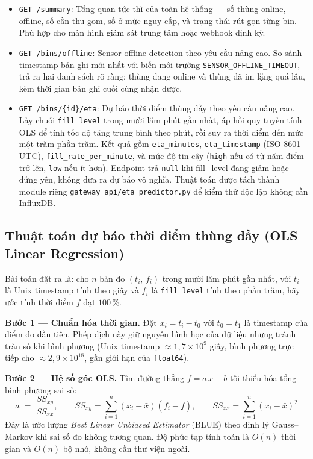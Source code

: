 \documentclass[12pt,a4paper]{article}
\begin{document}
\begin{itemize}[nosep]
\item \texttt{GET /summary}: Tổng quan tức thì của toàn hệ thống --- số thùng online, offline, số cần thu gom, số ở mức nguy cấp, và trạng thái rút gọn từng bin. Phù hợp cho màn hình giám sát trung tâm hoặc webhook định kỳ.

\item \texttt{GET /bins/offline}: Sensor offline detection theo yêu cầu nâng cao. So sánh timestamp bản ghi mới nhất với biến môi trường \texttt{SENSOR\_OFFLINE\_TIMEOUT}, trả ra hai danh sách rõ ràng: thùng đang online và thùng đã im lặng quá lâu, kèm thời gian bản ghi cuối cùng nhận được.

\item \texttt{GET /bins/\{id\}/eta}: Dự báo thời điểm thùng đầy theo yêu cầu nâng cao. Lấy chuỗi \texttt{fill\_level} trong mười lăm phút gần nhất, áp hồi quy tuyến tính OLS để tính tốc độ tăng trung bình theo phút, rồi suy ra thời điểm đến mức một trăm phần trăm. Kết quả gồm \texttt{eta\_minutes}, \texttt{eta\_timestamp} (ISO 8601 UTC), \texttt{fill\_rate\_per\_minute}, và mức độ tin cậy (\texttt{high} nếu có từ năm điểm trở lên, \texttt{low} nếu ít hơn). Endpoint trả \texttt{null} khi fill\_level đang giảm hoặc đứng yên, không đưa ra dự báo vô nghĩa. Thuật toán được tách thành module riêng \texttt{gateway\_api/eta\_predictor.py} để kiểm thử độc lập không cần InfluxDB.
\end{itemize}

\subsection{Thuật toán dự báo thời điểm thùng đầy (OLS Linear Regression)}

Bài toán đặt ra là: cho $n$ bản đo $(t_i,\,f_i)$ trong mười lăm phút gần nhất, với $t_i$ là Unix timestamp tính theo giây và $f_i$ là \texttt{fill\_level} tính theo phần trăm, hãy ước tính thời điểm $f$ đạt $100\,\%$.

\textbf{Bước 1 — Chuẩn hóa thời gian.} Đặt $x_i = t_i - t_0$ với $t_0 = t_1$ là timestamp của điểm đo đầu tiên. Phép dịch này giữ nguyên hình học của dữ liệu nhưng tránh tràn số khi bình phương (Unix timestamp $\approx 1{,}7 \times 10^9$ giây, bình phương trực tiếp cho $\approx 2{,}9 \times 10^{18}$, gần giới hạn của \texttt{float64}).

\textbf{Bước 2 — Hệ số góc OLS.} Tìm đường thẳng $f = a\,x + b$ tối thiểu hóa tổng bình phương sai số:
\[
a \;=\; \frac{SS_{xy}}{SS_{xx}}, \qquad
SS_{xy} = \sum_{i=1}^{n}(x_i - \bar{x})(f_i - \bar{f}), \qquad
SS_{xx} = \sum_{i=1}^{n}(x_i - \bar{x})^2
\]
Đây là ước lượng \emph{Best Linear Unbiased Estimator} (BLUE) theo định lý Gauss--Markov khi sai số đo không tương quan. Độ phức tạp tính toán là $O(n)$ thời gian và $O(n)$ bộ nhớ, không cần thư viện ngoài.
\end{document}
